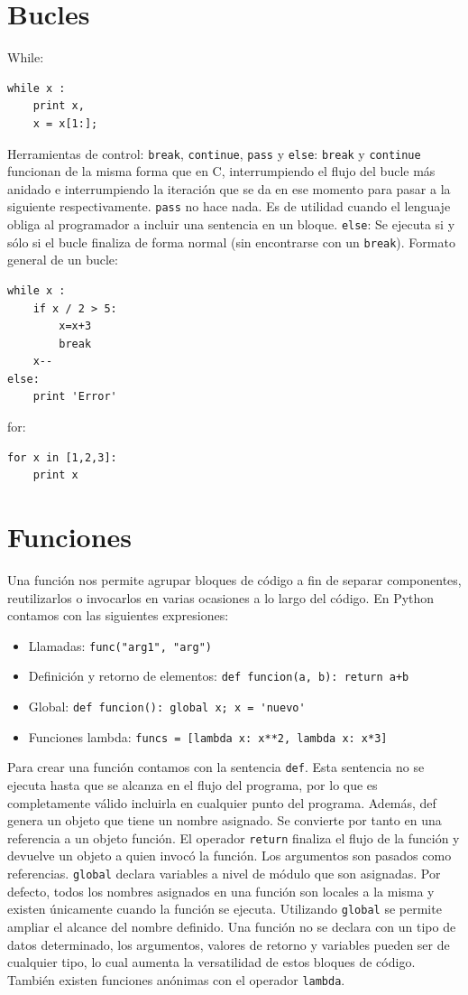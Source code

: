 \documentclass[12pt]{article} %
\begin{document}
\section{Bucles}
While:
\begin{lstlisting}[frame=single, showspaces=false]
while x :
	print x,
	x = x[1:];
\end{lstlisting}
Herramientas de control: \verb+break+, \verb+continue+, \verb+pass+ y \verb+else+:
\verb+break+ y \verb+continue+ funcionan de la misma forma que en C, interrumpiendo el flujo del bucle más anidado e interrumpiendo la iteración que se da en ese momento para pasar a la siguiente respectivamente.
\verb+pass+ no hace nada. Es de utilidad cuando el lenguaje obliga al programador a incluir una sentencia en un bloque.
\verb+else+: Se ejecuta si y sólo si el bucle finaliza de forma normal (sin encontrarse con un \verb+break+).
Formato general de un bucle:
\begin{lstlisting}[frame=single, showspaces=false]
while x :
	if x / 2 > 5:
		x=x+3
		break
	x--
else:
	print 'Error'
\end{lstlisting}
{\Large for:}
\begin{lstlisting}[frame=single, showspaces=false]
for x in [1,2,3]:
	print x
\end{lstlisting}

\section{Funciones}
Una función nos permite agrupar bloques de código a fin de separar componentes, reutilizarlos o invocarlos en varias ocasiones a lo largo del código. En Python contamos con las siguientes expresiones:
\begin{itemize}
	\item Llamadas: \verb+func("arg1", "arg")+
	\item Definición y retorno de elementos: \verb|def funcion(a, b): return a+b|
	\item Global: \verb+def funcion(): global x; x = 'nuevo'+
	\item Funciones lambda: \verb+funcs = [lambda x: x**2, lambda x: x*3]+
\end{itemize}

Para crear una función contamos con la sentencia \verb+def+. Esta sentencia no se ejecuta hasta que se alcanza en el flujo del programa, por lo que es completamente válido incluirla en cualquier punto del programa. Además, def genera un objeto que tiene un nombre asignado. Se convierte por tanto en una referencia a un objeto función. El operador \verb+return+ finaliza el flujo de la función y devuelve un objeto a quien invocó la función. Los argumentos son pasados como referencias. \verb+global+ declara variables a nivel de módulo que son asignadas. Por defecto, todos los nombres asignados en una función son locales a la misma y existen únicamente cuando la función se ejecuta. Utilizando \verb+global+ se permite ampliar el alcance del nombre definido.
Una función no se declara con un tipo de datos determinado, los argumentos, valores de retorno y variables pueden ser de cualquier tipo, lo cual aumenta la versatilidad de estos bloques de código.
También existen funciones anónimas con el operador \verb+lambda+.
\end{document}
